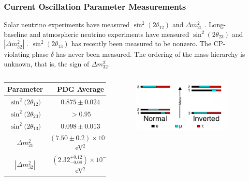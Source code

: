 \documentclass[10pt,professionalfonts,xcolor=table]{beamer}
\begin{document}
\frame
{
  \frametitle{Current Oscillation Parameter Measurements}
    \begin{itemize}
   \bang Solar neutrino experiments have measured $\sin^2(2 \theta_{12}) $ and $\Delta m_{21}^2$ .
   \bang Long-baseline and atmospheric  neutrino experiments have measured $\sin^2(2 \theta_{23}) $ and $|\Delta m_{32}^2|$ .  
   \bang $\sin^2(2 \theta_{13})$ has recently been measured to be nonzero.  
\bang The CP-violating phase $\delta$ has never been measured.
\bang The ordering of the mass hierarchy is unknown, that is, the sign of $\Delta m_{32}^2$.
\end{itemize}
\begin{columns}[c]
 \footnotesize
\begin{tabular}{ |c |  c| }
\hline  
Parameter & PDG Average\footnotemark \\  \hline  
  $\sin^2\big(2 \theta_{12}\big)$&$  0.875 \pm0.024$  \\ 
  $\sin^2\big(2 \theta_{23}\big)$&$  > 0.95                  $   \\ 
  $\sin^2\big(2 \theta_{13}\big)$&$  0.098 \pm0.013$  \\ 
    $\Delta m^2_{21}       $&$ (7.50 \pm 0.2) \times 10^{-5}$ eV${}^2$ \\
  $|\Delta m^2_{32}|       $&$ (2.32^{+0.12}_{-0.08} ) \times 10^{-3}$ eV${}^2$  \\
  \hline  
\end{tabular}
 \begin{figure} \includegraphics[width=\textwidth]{figures/figures/hierarchy.jpg} \end{figure}
 \vspace{8pt} 
\end{columns}
}
\end{document}
